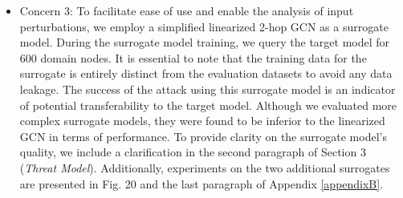 \documentclass[conference,compsoc]{IEEEtran}
\begin{document}
\begin{itemize}
\item Concern 3: To facilitate ease of use and enable the analysis of input perturbations, we employ a simplified linearized 2-hop GCN as a surrogate model. During the surrogate model training, we query the target model for 600 domain nodes. It is essential to note that the training data for the surrogate is entirely distinct from the evaluation datasets to avoid any data leakage. The success of the attack using this surrogate model is an indicator of potential transferability to the target model. Although we evaluated more complex surrogate models, they were found to be inferior to the linearized GCN in terms of performance. To provide clarity on the surrogate model's quality, we include a clarification in the second paragraph of Section 3 (\textit{Threat Model}). Additionally, experiments on the two additional surrogates are presented in Fig. 20 and the last paragraph of Appendix \ref{appendixB}.
\end{itemize}
\end{document}
